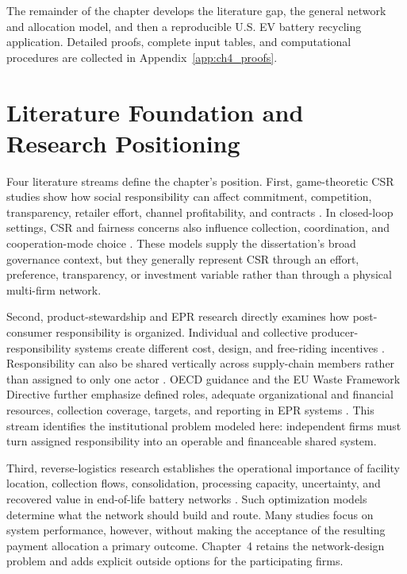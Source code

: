 The remainder of the chapter develops the literature gap, the general network and allocation model, and then a reproducible U.S. EV battery recycling application. Detailed proofs, complete input tables, and computational procedures are collected in Appendix~\ref{app:ch4_proofs}.

\section{Literature Foundation and Research Positioning}
\label{sec:ch4_literature_gap}

Four literature streams define the chapter's position. First, game-theoretic CSR studies show how social responsibility can affect commitment, competition, transparency, retailer effort, channel profitability, and contracts \cite{Buccella2024,FantiBuccella2017,Ferrara2017,Khosroshahi2019,Mahdiraji2023}. In closed-loop settings, CSR and fairness concerns also influence collection, coordination, and cooperation-mode choice \cite{ZhangLiang2023,ZhengB2022}. These models supply the dissertation's broad governance context, but they generally represent CSR through an effort, preference, transparency, or investment variable rather than through a physical multi-firm network.

Second, product-stewardship and EPR research directly examines how post-consumer responsibility is organized. Individual and collective producer-responsibility systems create different cost, design, and free-riding incentives \cite{AtasuSubramanian2012,FleckingerGlachant2010}. Responsibility can also be shared vertically across supply-chain members rather than assigned to only one actor \cite{JacobsSubramanian2012}. OECD guidance and the EU Waste Framework Directive further emphasize defined roles, adequate organizational and financial resources, collection coverage, targets, and reporting in EPR systems \cite{OECD2016EPR,EUWasteFrameworkDirective}. This stream identifies the institutional problem modeled here: independent firms must turn assigned responsibility into an operable and financeable shared system.

Third, reverse-logistics research establishes the operational importance of facility location, collection flows, consolidation, processing capacity, uncertainty, and recovered value in end-of-life battery networks \cite{tadaros2022location,bafadal2024proposed,wang2025planning,ma2024unlocking}. Such optimization models determine what the network should build and route. Many studies focus on system performance, however, without making the acceptance of the resulting payment allocation a primary outcome. Chapter~4 retains the network-design problem and adds explicit outside options for the participating firms.

